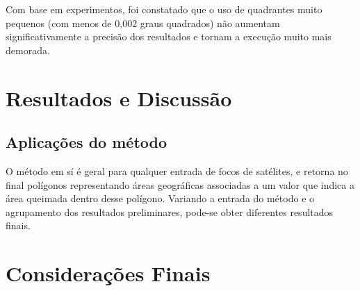 \documentclass[cic,tc]{iiufrgs}
\begin{document}
Com base em experimentos, foi constatado que o uso de quadrantes muito pequenos (com menos de 0,002 graus quadrados) não aumentam significativamente a precisão dos resultados e tornam a execução muito mais demorada.




\chapter{Resultados e Discussão}
\label{chp:resultados_discussão}

\section{Aplicações do método}

O método em sí é geral para qualquer entrada de focos de satélites, e retorna no final polígonos representando áreas geográficas associadas a um valor que indica a área queimada dentro desse polígono. Variando a entrada do método e o agrupamento dos resultados preliminares, pode-se obter diferentes resultados finais. \par



\chapter{Considerações Finais}





\end{document}
